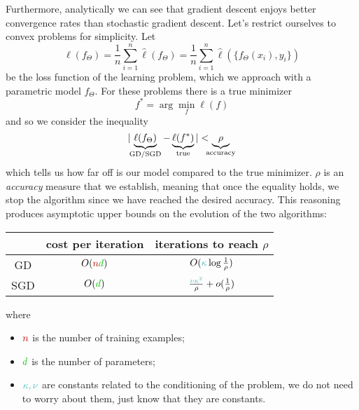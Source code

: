 Furthermore, analytically we can see that gradient descent enjoys better convergence rates than stochastic gradient descent. Let's restrict ourselves to convex problems for simplicity. Let 
\[
    \ell(f_{\Theta}) = \frac{1}{n}\sum_{i=1}^n \hat{\ell}  ( f_\Theta) = \frac{1}{n}\sum_{i=1}^n \hat{\ell}  ( \{ f_\Theta(x_i), y_i\})  
\] 
be the loss function of the learning problem, which we approach with a parametric model $f_{\Theta}$. For these problems there is a true minimizer 
\begin{equation}
    f^\ast = \arg\min_f \ell(f)
\end{equation}
and so we consider the inequality
\begin{equation}
    | \hspace{-0.1cm} \underbrace{\ell(f_\Theta)}_{{\textrm{GD/SGD}}} - \underbrace{\ell(f^\ast)}_{{\textrm{true}}} | < \hspace{-0.2cm} \underbrace{{\rho}}_{\textrm{accuracy}}
\end{equation}
which tells us how far off is our model compared to the true minimizer. $\rho$ is an \emph{accuracy} measure that we establish, meaning that once the equality holds, we stop the algorithm since we have reached the desired accuracy. This reasoning produces asymptotic upper bounds on the evolution of the two algorithms:
\begin{center}
    \begin{tabular}{ |c|c|c| } 
     \hline
     &\footnotesize\textbf{cost per iteration} & \footnotesize \textbf{iterations to reach $\rho$} \\ 
     \hline
    GD & $O({\color{red}n}{\color{darkgreen}d})$ & $O({\color{cyan}\kappa} \log \frac{1}{\rho})$ \\ 
     SGD & $O({\color{darkgreen}d})$ & $\frac{{\color{cyan}\nu \kappa^2}}{\rho} + o(\frac{1}{\rho})$ \\
     \hline
    \end{tabular}
\end{center}
where
\begin{itemize}
    \item ${\color{red}n}$ is the number of training examples;

    \item ${\color{darkgreen}d}$ is the number of parameters;
    
    \item ${\color{cyan}\kappa,\nu}$ are constants related to the conditioning of the problem, we do not need to worry about them, just know that they are constants.
\end{itemize}

